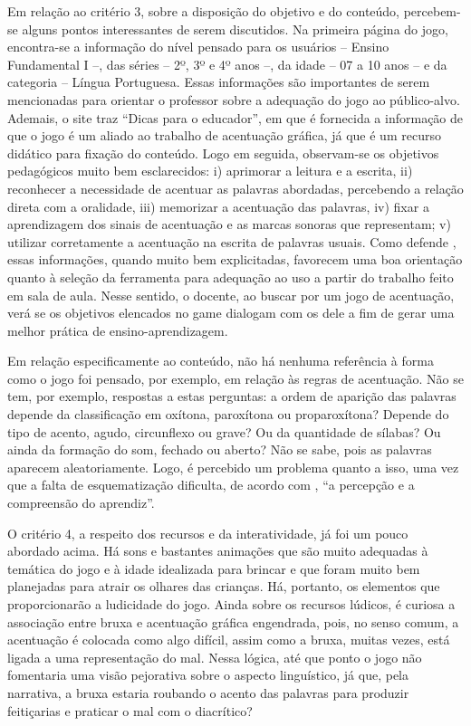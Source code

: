 \documentclass{textolivre}
\begin{document}
Em relação ao critério 3, sobre a disposição do objetivo e do conteúdo, percebem-se alguns pontos interessantes de serem discutidos. Na primeira página do jogo, encontra-se a informação do nível pensado para os usuários  – Ensino Fundamental I  –, das séries  – 2º, 3º e 4º anos  –, da idade  – 07 a 10 anos  – e da categoria  – Língua Portuguesa. Essas informações são importantes de serem mencionadas para orientar o professor sobre a adequação do jogo ao público-alvo. Ademais, o site traz “Dicas para o educador”, em que é fornecida a informação de que o jogo é um aliado ao trabalho de acentuação gráfica, já que é um recurso didático para fixação do conteúdo. Logo em seguida, observam-se os objetivos pedagógicos muito bem esclarecidos: i) aprimorar a leitura e a escrita, ii) reconhecer a necessidade de acentuar as palavras abordadas, percebendo a relação direta com a oralidade, iii) memorizar a acentuação das palavras, iv) fixar a aprendizagem dos sinais de acentuação e as marcas sonoras que representam; v) utilizar corretamente a acentuação na escrita de palavras usuais. Como defende \textcite{ribeiro2013}, essas informações, quando muito bem explicitadas, favorecem uma boa orientação quanto à seleção da ferramenta para adequação ao uso a partir do trabalho feito em sala de aula. Nesse sentido, o docente, ao buscar por um jogo de acentuação, verá se os objetivos elencados no game dialogam com os dele a fim de gerar uma melhor prática de ensino-aprendizagem.

Em relação especificamente ao conteúdo, não há nenhuma referência à forma como o jogo foi pensado, por exemplo, em relação às regras de acentuação. Não se tem, por exemplo, respostas a estas perguntas: a ordem de aparição das palavras depende da classificação em oxítona, paroxítona ou proparoxítona? Depende do tipo de acento, agudo, circunflexo ou grave? Ou da quantidade de sílabas? Ou ainda da formação do som, fechado ou aberto? Não se sabe, pois as palavras aparecem aleatoriamente. Logo, é percebido um problema quanto a isso, uma vez que a falta de esquematização dificulta, de acordo com \textcite[p. 77]{ribeiro2013}, “a percepção e a compreensão do aprendiz”.

O critério 4, a respeito dos recursos e da interatividade, já foi um pouco abordado acima. Há sons e bastantes animações que são muito adequadas à temática do jogo e à idade idealizada para brincar e que foram muito bem planejadas para atrair os olhares das crianças. Há, portanto, os elementos que proporcionarão a ludicidade do jogo. Ainda sobre os recursos lúdicos, é curiosa a associação entre bruxa e acentuação gráfica engendrada, pois, no senso comum, a acentuação é colocada como algo difícil, assim como a bruxa, muitas vezes, está ligada a uma representação do mal. Nessa lógica, até que ponto o jogo não fomentaria uma visão pejorativa sobre o aspecto linguístico, já que, pela narrativa, a bruxa estaria roubando o acento das palavras para produzir feitiçarias e praticar o mal com o diacrítico?
\end{document}
